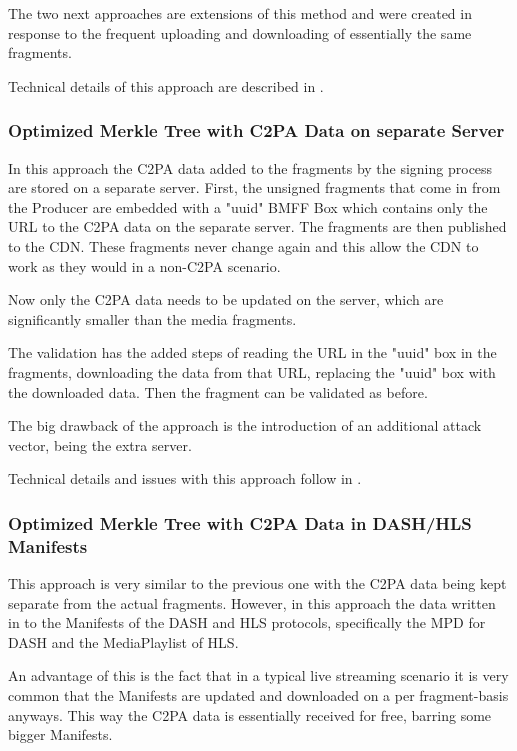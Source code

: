 The two next approaches are extensions of this method and were created in response to the frequent uploading and downloading of essentially the same fragments.

Technical details of this approach are described in .

\subsubsection{Optimized Merkle Tree with C2PA Data on separate Server}

In this approach the C2PA data added to the fragments by the signing process are stored on a separate server. First, the unsigned fragments that come in from the Producer are embedded with a "uuid" BMFF Box which contains only the URL to the C2PA data on the separate server. The fragments are then published to the CDN. These fragments never change again and this allow the CDN to work as they would in a non-C2PA scenario.

Now only the C2PA data needs to be updated on the server, which are significantly smaller than the media fragments.

The validation has the added steps of reading the URL in the "uuid" box in the fragments, downloading the data from that URL, replacing the "uuid" box with the downloaded data. Then the fragment can be validated as before.

The big drawback of the approach is the introduction of an additional attack vector, being the extra server.

Technical details and issues with this approach follow in .

\subsubsection{Optimized Merkle Tree with C2PA Data in DASH/HLS Manifests}

This approach is very similar to the previous one with the C2PA data being kept separate from the actual fragments. However, in this approach the data written in to the Manifests of the DASH and HLS protocols, specifically the MPD for DASH and the MediaPlaylist of HLS.

An advantage of this is the fact that in a typical live streaming scenario it is very common that the Manifests are updated and downloaded on a per fragment-basis anyways. This way the C2PA data is essentially received for free, barring some bigger Manifests.

